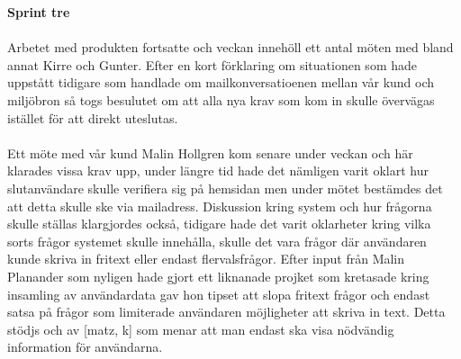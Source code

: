 \documentclass[12pt]{article}
\begin{document}
\textbf{Sprint tre} \\\\
Arbetet med produkten fortsatte och veckan innehöll ett antal möten med bland annat Kirre och Gunter. Efter en kort förklaring om situationen som hade uppstått tidigare som handlade om mailkonversatioenen mellan vår kund och miljöbron så togs besulutet om att alla nya krav som kom in skulle övervägas istället för att direkt uteslutas. \\\\
Ett möte med vår kund Malin Hollgren kom senare under veckan och här klarades vissa krav upp, under längre tid hade det nämligen varit oklart hur slutanvändare skulle verifiera sig på hemsidan men under mötet bestämdes det att detta skulle ske via mailadress. Diskussion kring system och hur frågorna skulle ställas klargjordes också, tidigare hade det varit oklarheter kring vilka sorts frågor systemet skulle innehålla, skulle det vara frågor där användaren kunde skriva in fritext eller endast flervalsfrågor. Efter input från Malin Planander som nyligen hade gjort ett liknanade projket som kretasade kring insamling av användardata gav hon tipset att slopa fritext frågor och endast satsa på frågor som limiterade användaren möjligheter att skriva in text. Detta stödjs och av [matz, k] som menar att man endast ska visa nödvändig information för användarna.  
\end{document}
